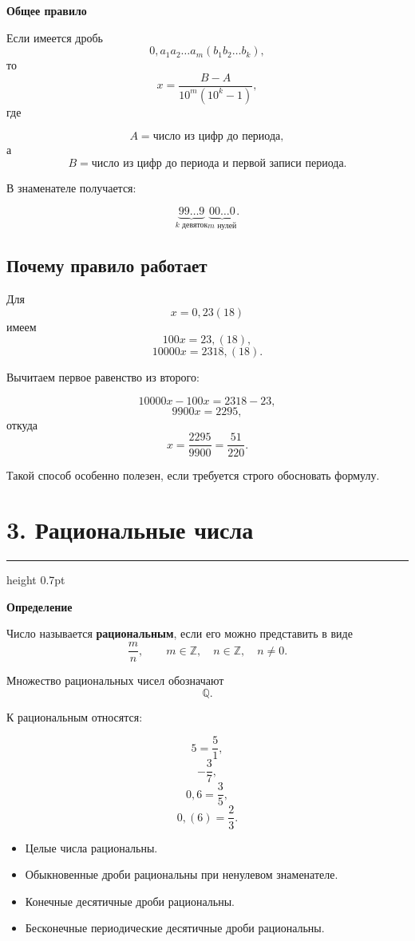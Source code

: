 \documentclass[a4paper,12pt]{article}
\newcommand{\checkitem}{\(\square\)}
\newcommand{\Z}{\mathbb{Z}}
\newcommand{\Q}{\mathbb{Q}}
\newcommand{\key}[1]{%
    \par\medskip
    {\color{darkaccent}\bfseries #1}
    \par\smallskip
}
\newcommand{\ruleline}{%
    \par\medskip
    {\color{accent}\hrule height 0.7pt}
    \medskip
}
\begin{document}
\key{Общее правило}

Если имеется дробь
\[
0{,}a_1a_2\ldots a_m(b_1b_2\ldots b_k),
\]
то
\[
x=
\frac{B-A}
{10^m(10^k-1)},
\]
где

\[
A=\text{число из цифр до периода},
\]
а
\[
B=\text{число из цифр до периода и первой записи периода}.
\]

В знаменателе получается:

\[
\underbrace{99\ldots9}_{k\text{ девяток}}
\underbrace{00\ldots0}_{m\text{ нулей}}.
\]

\subsection*{\textcolor{darkaccent}{Почему правило работает}}

Для
\[
x=0{,}23(18)
\]
имеем
\[
100x=23{,}(18),
\]
\[
10000x=2318{,}(18).
\]

Вычитаем первое равенство из второго:

\[
10000x-100x=2318-23,
\]
\[
9900x=2295,
\]
откуда
\[
x=\frac{2295}{9900}
=\frac{51}{220}.
\]

Такой способ особенно полезен, если требуется строго обосновать
формулу.


\section*{\textcolor{darkaccent}{3. Рациональные числа}}

\ruleline

\key{Определение}

Число называется \textbf{рациональным}, если его можно представить
в виде
\[
\frac{m}{n},
\qquad
m\in\Z,\quad n\in\Z,\quad n\ne0.
\]

Множество рациональных чисел обозначают
\[
\Q.
\]

К рациональным относятся:

\[
5=\frac51,
\]
\[
-\frac37,
\]
\[
0{,}6=\frac35,
\]
\[
0{,}(6)=\frac23.
\]

\begin{itemize}
    \item[\checkitem] Целые числа рациональны.
    \item[\checkitem] Обыкновенные дроби рациональны при ненулевом знаменателе.
    \item[\checkitem] Конечные десятичные дроби рациональны.
    \item[\checkitem] Бесконечные периодические десятичные дроби рациональны.
\end{itemize}
\end{document}
